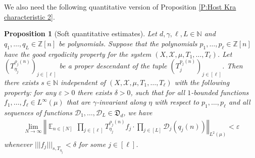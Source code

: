 \documentclass[11pt]{amsart}
\newtheorem{proposition}[lemma]{Proposition}
\theoremstyle{definition}
\newcommand{\N}{{\mathbb N}}
\newcommand{\Z}{{\mathbb Z}}
\newcommand{\CD}{{\mathcal D}}
\newcommand{\CX}{{\mathcal X}}
\newcommand{\FD}{{\mathfrak D}}
\newcommand{\veps}{\varepsilon}
\newcommand{\norm}[1]{\left\Vert #1\right\Vert}
\newcommand{\nnorm}[1]{\lvert\!|\!| #1|\!|\!\rvert}
\DeclareMathOperator*{\E}{\mathbb{E}}
\newcommand{\brac}[1]{\mathopen{}\left( #1 \mathclose{}\right)}
\begin{document}
We also need the following quantitative version of Proposition \ref{P:Host Kra characteristic 2}.
\begin{proposition}[Soft quantitative estimates]\label{P:Host Kra characteristic quantitative}
    Let $d,\gamma, \ell, L\in\N$ and  $q_1, \ldots, q_L\in\Z[n]$ be  polynomials. Suppose that the polynomials  $p_1, \ldots, p_\ell\in \Z[n]$ have the good ergodicity property for the system $(X,\CX, \mu,T_1, \ldots, T_\ell)$. Let  $\brac{T_{\eta_{j}}^{\rho_{j}(n)}}_{j\in[\ell]}$ be a proper descendant of the tuple $\brac{T_j^{p_j(n)}}_{j\in[\ell]}$.
    Then there exists $s\in\N$ independent of  $(X,\CX, \mu,T_1, \ldots, T_\ell)$ with the following property: for any $\veps>0$ there exists $\delta>0$, such that for all $1$-bounded functions $f_1, \ldots, f_\ell\in L^\infty(\mu)$ that are $\gamma$-invariant along $\eta$ with respect to $p_1, \ldots, p_\ell$ and all sequences of  functions $\CD_{1}, \ldots, \CD_L\in\FD_d$, we have
	\begin{align*}%
	    \lim_{N\to\infty}\norm{\E_{n\in [N]} \,\prod_{j\in[\ell]}T_{{\eta_j}}^{\rho_j(n)}f_j \cdot \prod_{j\in[L]}\CD_{j}(q_j(n))}_{L^2(\mu)} < \veps
	\end{align*}
	whenever $\nnorm{f_j}_{s, T_{\eta_j}} < \delta$ for some $j\in[\ell]$.
\end{proposition}
\end{document}
